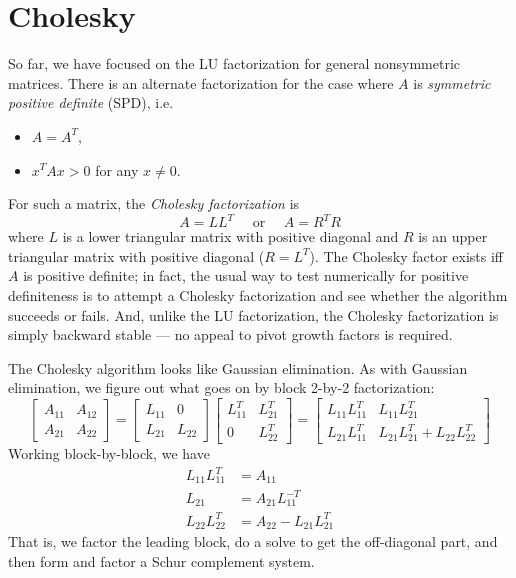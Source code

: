 \documentclass[12pt, leqno]{article}
\begin{document}

\section{Cholesky}

So far, we have focused on the LU factorization for general
nonsymmetric matrices.  There is an alternate factorization
for the case where $A$ is {\em symmetric positive definite} (SPD),
i.e.
\begin{itemize}
\item $A = A^T$,
\item $x^T A x > 0$ for any $x \neq 0$.
\end{itemize}
For such a matrix, the {\em Cholesky factorization} is
\[
  A = LL^T \quad \mbox{ or } \quad A = R^T R
\]
where $L$ is a lower triangular matrix with positive diagonal and $R$
is an upper triangular matrix with positive diagonal ($R = L^T$).  The
Cholesky factor exists iff $A$ is positive definite; in fact, the
usual way to test numerically for positive definiteness is to attempt
a Cholesky factorization and see whether the algorithm succeeds or
fails.  And, unlike the LU factorization, the Cholesky factorization
is simply backward stable --- no appeal to pivot growth factors is required.

The Cholesky algorithm looks like Gaussian elimination.  As
with Gaussian elimination, we figure out what goes on
by block 2-by-2 factorization:
\[
\begin{bmatrix} A_{11} & A_{12} \\ A_{21} & A_{22} \end{bmatrix} =
\begin{bmatrix} L_{11} & 0 \\ L_{21} & L_{22} \end{bmatrix}
\begin{bmatrix} L_{11}^T & L_{21}^T \\ 0 & L_{22}^T \end{bmatrix} =
\begin{bmatrix}
  L_{11} L_{11}^T & L_{11} L_{21}^T \\
  L_{21} L_{11}^T & L_{21} L_{21}^T+ L_{22} L_{22}^T
\end{bmatrix}
\]
Working block-by-block, we have
\begin{align*}
  L_{11} L_{11}^T &= A_{11} \\
  L_{21} &= A_{21} L_{11}^{-T} \\
  L_{22} L_{22}^T &= A_{22} - L_{21} L_{21}^T
\end{align*}
That is, we factor the leading block, do a solve to get the
off-diagonal part, and then form and factor a Schur complement
system.
\end{document}
